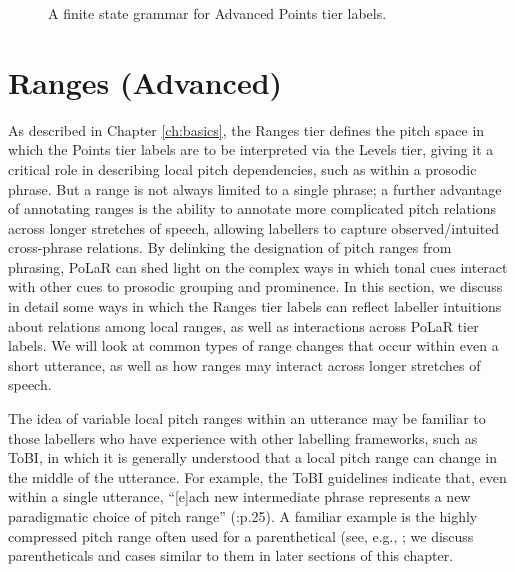\documentclass[11pt, twoside]{memoir}
\begin{document}
\begin{figure}[H]
\caption{A finite state grammar for Advanced Points tier labels.%
\label{fig:Points FSG complete}%
}
\end{figure}


\section{Ranges (Advanced)}\label{sec:ranges-advanced}

As described in Chapter \ref{ch:basics}, the Ranges tier defines the pitch space in which the Points tier labels are to be interpreted via the Levels tier, giving it a critical role in describing local pitch dependencies, such as within a prosodic phrase. But a range is not always limited to a single phrase; a further advantage of annotating ranges is the ability to annotate more complicated pitch relations across longer stretches of speech, allowing labellers to capture observed\slash intuited cross-phrase relations. By delinking the designation of pitch ranges from phrasing, PoLaR can shed light on the complex ways in which tonal cues interact with other cues to prosodic grouping and prominence. In this section, we discuss in detail some ways in which the Ranges tier labels can reflect labeller intuitions about relations among local ranges, as well as interactions across PoLaR tier labels. We will look at common types of range changes that occur within even a short utterance, as well as how ranges may interact across longer stretches of speech.

The idea of variable local pitch ranges within an utterance may be familiar to those labellers who have experience with other labelling frameworks, such as ToBI, in which it is generally understood that a local pitch range can change in the middle of the utterance. For example, the ToBI guidelines indicate that, even within a single utterance, “[e]ach new intermediate phrase represents a new paradigmatic choice of pitch range” (\citealt{beckmanayers97}:p.25). A familiar example is the highly compressed pitch range often used for a parenthetical (see, e.g., \citealt{dehewichmann10}; we discuss parentheticals and cases similar to them in later sections of this chapter.
\end{document}
